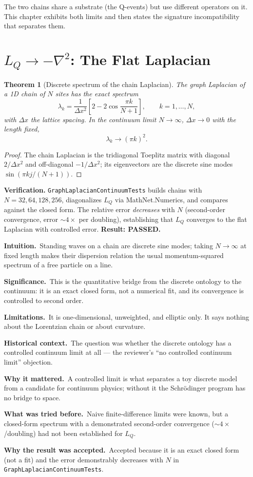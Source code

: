 \documentclass[10pt,twoside,openany]{book}
\newtheorem{theorem}{Theorem}[chapter]
\newcommand{\theoremnotes}[3]{%
  \par\medskip\noindent
  \textbf{Intuition.}\ #1\par
  \textbf{Significance.}\ #2\par
  \textbf{Limitations.}\ #3\par}
\newcommand{\historynotes}[4]{%
  \par\smallskip\noindent
  \textbf{Historical context.}\ #1\par
  \textbf{Why it mattered.}\ #2\par
  \textbf{What was tried before.}\ #3\par
  \textbf{Why the result was accepted.}\ #4\par}
\begin{document}
The two chains share a substrate (the Q-events) but use different operators on it. This
chapter exhibits both limits and then states the signature incompatibility that separates
them.

\section{$L_Q \to -\nabla^2$: The Flat Laplacian}
\label{ch:flat-laplacian}

\begin{theorem}[Discrete spectrum of the chain Laplacian]
The graph Laplacian of a 1D chain of $N$ sites has the exact spectrum
\begin{equation}
\lambda_k = \frac{1}{\Delta x^2}\left[2 - 2\cos\frac{\pi k}{N+1}\right],
\qquad k=1,\dots,N,
\end{equation}
with $\Delta x$ the lattice spacing. In the continuum limit $N\to\infty$, $\Delta x\to0$
with the length fixed,
\begin{equation}
\lambda_k \to (\pi k)^2 .
\end{equation}
\end{theorem}

\begin{proof}
The chain Laplacian is the tridiagonal Toeplitz matrix with diagonal $2/\Delta x^2$ and
off-diagonal $-1/\Delta x^2$; its eigenvectors are the discrete sine modes
$\sin(\pi k j/(N+1))$.
\end{proof}

\textbf{Verification.} \texttt{GraphLaplacianContinuumTests} builds chains with
$N=32,64,128,256$, diagonalizes $L_Q$ via MathNet.Numerics, and compares against the closed
form. The relative error \emph{decreases} with $N$ (second-order convergence, error
$\sim4\times$ per doubling), establishing that $L_Q$ converges to the flat Laplacian with
controlled error. \textbf{Result: PASSED.}

\theoremnotes
{Standing waves on a chain are discrete sine modes; taking $N\to\infty$ at fixed length
makes their dispersion relation the usual momentum-squared spectrum of a free particle on
a line.}
{This is the quantitative bridge from the discrete ontology to the continuum: it is an
exact closed form, not a numerical fit, and its convergence is controlled to second order.}
{It is one-dimensional, unweighted, and elliptic only. It says nothing about the
Lorentzian chain or about curvature.}

\historynotes
{The question was whether the discrete ontology has a controlled continuum limit at all ---
the reviewer's ``no controlled continuum limit'' objection.}
{A controlled limit is what separates a toy discrete model from a candidate for continuum
physics; without it the Schr\"odinger program has no bridge to space.}
{Naive finite-difference limits were known, but a closed-form spectrum with a demonstrated
second-order convergence ($\sim4\times$/doubling) had not been established for $L_Q$.}
{Accepted because it is an exact closed form (not a fit) and the error demonstrably
decreases with $N$ in \texttt{GraphLaplacianContinuumTests}.}
\end{document}
